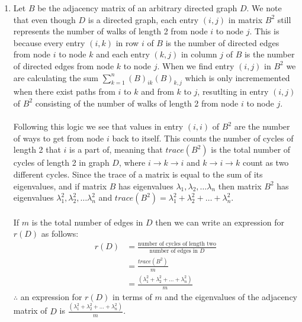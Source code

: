 \documentclass{article}
\begin{document}
\begin{enumerate}[label=(\alph*), left=10pt, itemsep=10pt]
        \item \begin{minipage}[t]{0.9\textwidth}
            Let $B$ be the adjacency matrix of an arbitrary directed graph $D$.
            We note that even though $D$ is a directed graph, each entry $(i,j)$ in matrix
            $B^{2}$ still represents the number of walks of length 2 from node $i$ to node $j$.
            This is because every entry $(i,k)$ in row $i$ of $B$ is the number of directed edges
            from node $i$ to node $k$ and each entry $(k,j)$ in column $j$ of $B$ is the number of
            directed edges from node $k$ to node $j$. When we find entry $(i,j)$ in $B^{2}$
            we are calculating the sum $\sum_{k=1}^{n}(B)_{ik}(B)_{k,j}$ which is
            only incrememented when there exist paths from $i$ to $k$ and from $k$ to $j$,
            resutlting in entry $(i,j)$ of $B^{2}$ consisting of the number of walks of length 2
            from node $i$ to node $j$.\\\\
            Following this logic we see that values in entry $(i,i)$ of $B^{2}$ are the
            number of ways to get from node $i$ back to itself. This counts the number of cycles
            of length 2 that $i$ is a part of, meaning that $trace(B^{2})$ is the total number
            of cycles of length 2 in graph $D$, where $i\rightarrow k \rightarrow i$ and
            $k \rightarrow i \rightarrow k$ count as two different cycles. Since the trace
            of a matrix is equal to the sum of its eigenvalues, and if matrix $B$ has
            eigenvalues $\lambda_{1}, \lambda_{2}, \dots \lambda_{n}$ then matrix $B^{2}$ has
            eigenvalues $\lambda^{2}_{1}, \lambda^{2}_{2}, \dots \lambda^{2}_{n}$ and
            $trace(B^{2}) = \lambda^{2}_{1}+\lambda^{2}_{2}+ \dots +\lambda^{2}_{n}$.\\\\
            If $m$ is the total number of edges in $D$ then we can write an expression for
            $r(D)$ as follows:
            \begin{align*}
                r(D) &= \frac{\text{number of cycles of length two}}{\text{number of edges in }D}\\
                     &= \frac{trace(B^{2})}{m}\\
                     &= \frac{(\lambda^{2}_{1}+\lambda^{2}_{2}+ \dots +\lambda^{2}_{n})}{m}
            \end{align*}
            $\therefore$ an expression for $r(D)$ in terms of $m$ and the eigenvalues of the
            adjacency matrix of $D$ is
            $\displaystyle\frac{(\lambda^{2}_{1}+\lambda^{2}_{2}+ \dots +\lambda^{2}_{n})}{m}$.
        \end{minipage}
    \end{enumerate}
    
\end{document}
